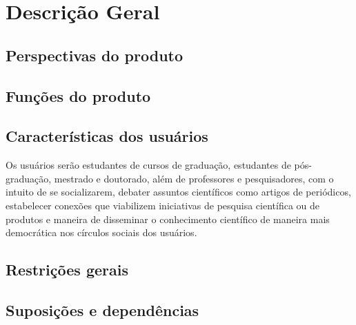 \chapter{Descrição Geral}

\section{Perspectivas do produto}

\section{Funções do produto}

\section{Características dos usuários}
Os usuários serão estudantes de cursos de graduação, estudantes de pós-graduação, mestrado e doutorado, além de professores e pesquisadores, com o intuito de se socializarem, debater assuntos científicos como artigos de periódicos, estabelecer conexões que viabilizem iniciativas de pesquisa científica ou de produtos e maneira de disseminar o conhecimento científico de maneira mais democrática nos círculos sociais dos usuários.


\section{Restrições gerais}

\section{Suposições e dependências}